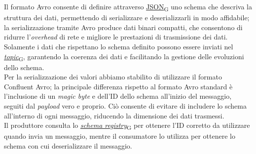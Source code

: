 Il formato Avro consente di definire attraverso \href{https://7last.github.io/docs/pb/documentazione-interna/glossario\#javascript-object-notation}{JSON\textsubscript{G}} uno schema che descriva la struttura dei dati, permettendo di serializzare e deserializzarli in modo affidabile; la serializzazione tramite
Avro produce dati binari compatti, che consentono di ridurre l'\textit{overhead} di rete e migliore le prestazioni di trasmissione dei dati.
Solamente i dati che rispettano lo schema definito possono essere inviati nel \href{https://7last.github.io/docs/pb/documentazione-interna/glossario\#topic}{\textit{topic}\textsubscript{G}}, garantendo la coerenza dei dati e facilitando la gestione delle evoluzioni dello schema.\\
Per la serializzazione dei valori abbiamo stabilito di utilizzare il formato Confluent Avro; la principale differenza rispetto al formato Avro standard è l'inclusione di un \textit{magic byte}
e dell'ID dello schema all'inizio del messaggio, seguiti dal \textit{payload} vero e proprio. Ciò consente di evitare di includere lo schema all'interno di ogni messaggio, riducendo la dimensione dei dati trasmessi.\\
Il produttore consulta lo \href{https://7last.github.io/docs/pb/documentazione-interna/glossario\#schema-registry}{\textit{schema registry}\textsubscript{G}} per ottenere l'ID corretto da utilizzare quando invia un messaggio, mentre il consumatore lo utilizza per ottenere lo schema con
cui deserializzare il messaggio.

